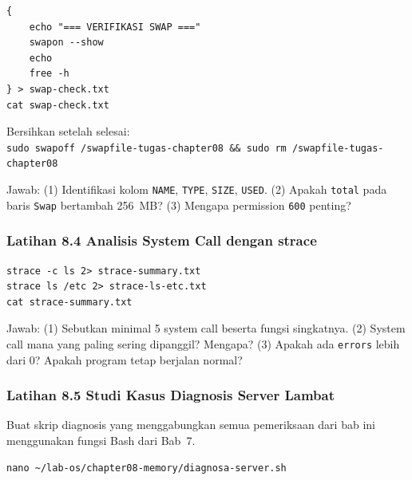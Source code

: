 \begin{lstlisting}[caption={Verifikasi dan simpan hasil}]
{
    echo "=== VERIFIKASI SWAP ==="
    swapon --show
    echo
    free -h
} > swap-check.txt
cat swap-check.txt
\end{lstlisting}

\begin{notebox}
Bersihkan setelah selesai:\\
\texttt{sudo swapoff /swapfile-tugas-chapter08 \&\& sudo rm /swapfile-tugas-chapter08}
\end{notebox}

Jawab: (1) Identifikasi kolom \texttt{NAME}, \texttt{TYPE}, \texttt{SIZE}, \texttt{USED}.
(2) Apakah \texttt{total} pada baris \texttt{Swap} bertambah 256~MB? (3) Mengapa
permission \texttt{600} penting?

\subsubsection{Latihan 8.4 Analisis System Call dengan strace}

\begin{lstlisting}[caption={Simpan Ringkasan dan Detail System Call}]
strace -c ls 2> strace-summary.txt
strace ls /etc 2> strace-ls-etc.txt
cat strace-summary.txt
\end{lstlisting}

Jawab: (1) Sebutkan minimal 5 system call beserta fungsi singkatnya. (2) System call
mana yang paling sering dipanggil? Mengapa? (3) Apakah ada \texttt{errors} lebih dari
0? Apakah program tetap berjalan normal?

\subsubsection{Latihan 8.5 Studi Kasus Diagnosis Server Lambat}

Buat skrip diagnosis yang menggabungkan semua pemeriksaan dari bab ini menggunakan
fungsi Bash dari Bab~7.

\begin{lstlisting}[caption={Buka file dengan nano}]
nano ~/lab-os/chapter08-memory/diagnosa-server.sh
\end{lstlisting}

